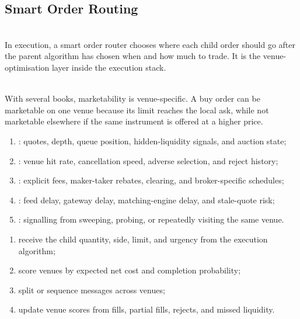 \subsection{Smart Order Routing}

\begin{definition} \\
In execution, a smart order router chooses where each child order should go after the parent algorithm has chosen when and how much to trade. It is the venue-optimisation layer inside the execution stack.
\end{definition}

\begin{definition} \\
With several books, marketability is venue-specific. A buy order can be marketable on one venue because its limit reaches the local ask, while not marketable elsewhere if the same instrument is offered at a higher price.
\end{definition}

\begin{taxonomy} 
\begin{enumerate}[label=\roman*.]
\setlength{\itemsep}{0pt}
\item {}: quotes, depth, queue position, hidden-liquidity signals, and auction state;
\item {}: venue hit rate, cancellation speed, adverse selection, and reject history;
\item {}: explicit fees, maker-taker rebates, clearing, and broker-specific schedules;
\item {}: feed delay, gateway delay, matching-engine delay, and stale-quote risk;
\item {}: signalling from sweeping, probing, or repeatedly visiting the same venue.
\end{enumerate}
\end{taxonomy}

\begin{process} 
\begin{enumerate}[label=\roman*.]
\setlength{\itemsep}{0pt}
\item receive the child quantity, side, limit, and urgency from the execution algorithm;
\item score venues by expected net cost and completion probability;
\item split or sequence messages across venues;
\item update venue scores from fills, partial fills, rejects, and missed liquidity.
\end{enumerate}
\end{process}

